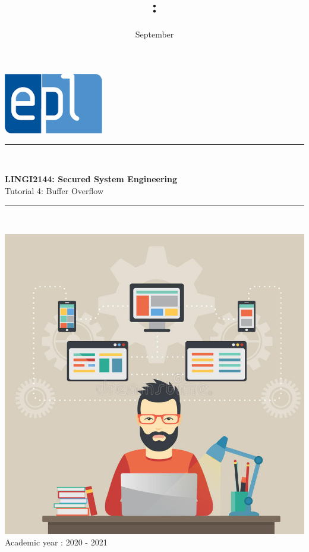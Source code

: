 \documentclass{article}
\title{\codecourse : \titlecourse}
\author{\othor}
\date{September \year}
\newcommand{\codecourse}{LINGI2144}
\newcommand{\titlecourse}{Secured System Engineering}
\newcommand{\ayear}{2020 - 2021}
\begin{document}
        \hfill\includegraphics[scale=0.5]{image/logoepl.png}
        
        \vspace*{\fill}
            
        \begin{center}
        
            \rule{1\textwidth}{1pt}\\
	            \vspace{0.5\baselineskip}
		            \begin{LARGE}
	                	\textbf{\codecourse : \titlecourse}\\
	                	Tutorial 4: Buffer Overflow
		            \end{LARGE}
		        \vspace{0.5\baselineskip}       
	        \rule{1\textwidth}{1pt}\\
	        
	        \vspace{0.5\baselineskip}
	        
	        \includegraphics[scale=1.5]{image/MCP.jpg}\\

	        \vspace{0.5\baselineskip}
	            Academic year : \ayear\\
                
		\end{center}
		
\end{document}
